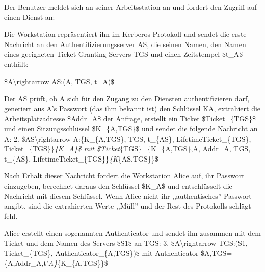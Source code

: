 \documentclass[a4paper]{article}
\begin{document}
\begin{multicols}{3}
      \begin{itemize*}
            \item Der Benutzer meldet sich an seiner Arbeitsstation an und fordert den
            Zugriff auf einen Dienst an:
            \begin{itemize*}
                  \item Die Workstation repräsentiert ihn im Kerberos-Protokoll und sendet die erste Nachricht an den Authentifizierungsserver AS, die seinen Namen, den Namen eines geeigneten Ticket-Granting-Servers TGS und einen Zeitstempel \$t\_A\$ enthält:
            \end{itemize*}
            \begin{enumerate*}
                  \def\labelenumi{\arabic{enumi}.}
                  \item \$A\textbackslash rightarrow AS:(A, TGS, t\_A)\$
            \end{enumerate*}
            \item Der AS prüft, ob A sich für den Zugang zu den Diensten
            authentifizieren darf, generiert aus A's Passwort (das ihm bekannt
            ist) den Schlüssel KA, extrahiert die Arbeitsplatzadresse \$Addr\_A\$
            der Anfrage, erstellt ein Ticket \$Ticket\_\{TGS\}\$ und einen
            Sitzungsschlüssel \$K\_\{A,TGS\}\$ und sendet die folgende Nachricht
            an A: 2. \$AS\textbackslash rightarrow A:\{K\_\{A,TGS\}, TGS,
            t\_\{AS\}, LifetimeTicket\_\{TGS\}, Ticket\_\{TGS\}\}\emph{\{K\_A\}\$
                  mit \$Ticket}\{TGS\}=\{K\_\{A,TGS\},A, Addr\_A, TGS, t\_\{AS\},
            LifetimeTicket\_\{TGS\}\}\emph{\{K}\{AS,TGS\}\}\$
            \item Nach Erhalt dieser Nachricht fordert die Workstation Alice auf, ihr
            Passwort einzugeben, berechnet daraus den Schlüssel \$K\_A\$ und
            entschlüsselt die Nachricht mit diesem Schlüssel. Wenn Alice nicht ihr
            ,,authentisches'' Passwort angibt, sind die extrahierten Werte
            ,,Müll'' und der Rest des Protokolls schlägt fehl.
            \item Alice erstellt einen sogenannten Authenticator und sendet ihn zusammen
            mit dem Ticket und dem Namen des Servers \$S1\$ an TGS: 3.
            \$A\textbackslash rightarrow TGS:(S1, Ticket\_\{TGS\},
            Authenticator\_\{A,TGS\})\$ mit Authenticator
            \$A,TGS=\{A,Addr\_A,t'\emph{A\}}\{K\_\{A,TGS\}\}\$

\end{itemize*}
\end{multicols}
\end{document}
